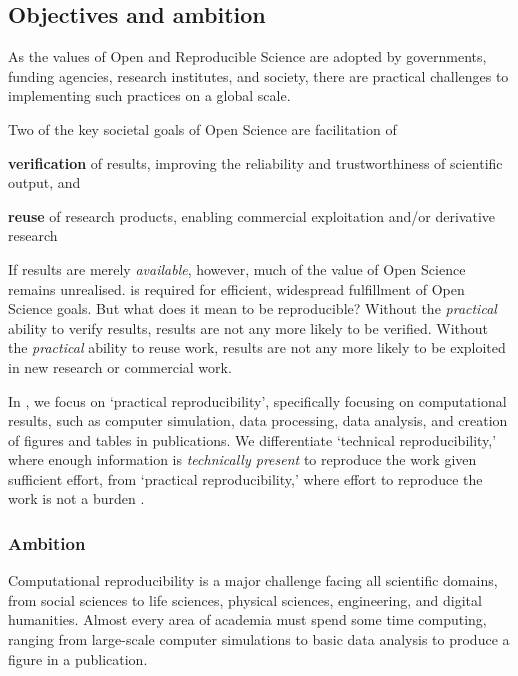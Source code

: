 \subsection{Objectives and ambition}

\label{sect:objectives}

As the values of Open and Reproducible Science are adopted by
governments, funding agencies, research institutes, and society,
there are practical challenges to implementing such practices on a global scale.

Two of the key societal goals of Open Science are facilitation of

\begin{compactenum}
\item \textbf{verification} of results, improving the reliability and trustworthiness of scientific output, and
\item \textbf{reuse} of research products, enabling commercial exploitation and/or derivative research
\end{compactenum}

If results are merely \emph{available}, however,
much of the value of Open Science remains unrealised.
 is required for efficient, widespread fulfillment of Open Science goals.
But what does it mean to be reproducible?
Without the \emph{practical} ability to verify results, results are not
any more likely to be verified.
Without the \emph{practical} ability to reuse work, results are not
any more likely to be exploited in new research or commercial work.

In \TheProject, we focus on `practical reproducibility',
specifically focusing on computational results, such as computer simulation, data
processing, data analysis, and creation of figures and tables in publications.
We differentiate `technical reproducibility,'
where enough information is \emph{technically present} to reproduce the work given sufficient effort,
from `practical reproducibility,'
where effort to reproduce the work is not a burden \cite{binder}.

\subsubsection{Ambition}

Computational reproducibility is a major challenge facing all scientific domains,
from social sciences to life sciences, physical sciences, engineering, and digital humanities.
Almost every area of academia must spend some time computing,
ranging from large-scale computer simulations to basic data analysis to produce a figure in a publication.

